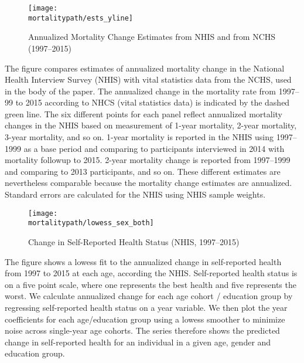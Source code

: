\begin{figure}[H]
  \caption{Annualized Mortality Change Estimates from NHIS and from NCHS (1997--2015)}
  \label{fig:nhis_mort}
  \begin{center}
    \texttt{[image: \\mortalitypath/ests\_yline]} \\
  \end{center}
\end{figure}
\scriptsize{The figure compares estimates of annualized mortality
  change in the National Health Interview Survey (NHIS) with vital
  statistics data from the NCHS, used in the body of the paper. The
  annualized change in the mortality rate from 1997--99 to 2015 according to
  NHCS (vital statistics data) is indicated by the dashed green
  line. The six different points for each panel reflect annualized
  mortality changes in the NHIS based on measurement of 1-year
  mortality, 2-year mortality, 3-year mortality, and so on. 1-year
  mortality is reported in the NHIS using 1997--1999 as a base period
  and comparing to participants interviewed in 2014 with mortality followup to 2015. 2-year
  mortality change is reported from 1997--1999 and comparing to 2013 participants,
  and so on. These different estimates are
  nevertheless comparable because the mortality change
  estimates are annualized. Standard errors are calculated for the
  NHIS using NHIS sample weights.}

\begin{figure}[H]
  \caption{Change in Self-Reported Health Status (NHIS, 1997--2015)}
  \label{fig:nhis_health}
  \begin{center}
    \texttt{[image: \\mortalitypath/lowess\_sex\_both]} \\
  \end{center}
\end{figure}
\scriptsize{The figure shows a lowess fit to the annualized change in
  self-reported health from 1997 to 2015 at each age, according the
  NHIS. Self-reported health status is on a five point scale, where
  one represents the best health and five represents the worst.  We
  calculate annualized change for each age cohort / education group by
  regressing self-reported health status on a year variable. We then
  plot the year coefficients for each age/education group using a
  lowess smoother to minimize noise across single-year age
  cohorts. The series therefore shows the predicted change in
  self-reported health for an individual in a given age, gender and
  education group.}



